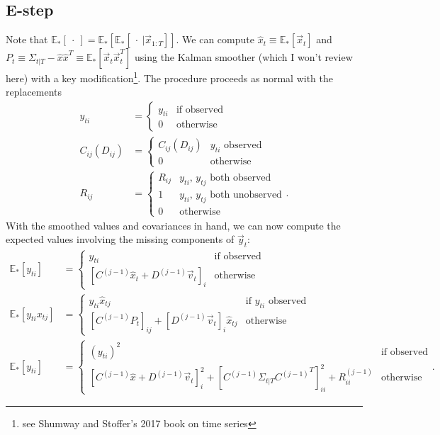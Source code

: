 \documentclass[10pt]{article}
\newcommand\e{\mathbb{E}}
\begin{document}
\subsection{E-step}

Note that $\e_*[\ \cdot\ ] = \e_*[\e_*[\ \cdot\ | \vec{x}_{1:T}]]$. We can compute $\hat{x}_t \equiv \e_*[\vec{x}_t]$ and $P_t \equiv \Sigma_{t|T} - \hat{x}\hat{x}^T \equiv \e_*[\vec{x}_t \vec{x}_t^T]$ using the Kalman smoother (which I won't review here) with a key modification\footnote{see Shumway and Stoffer's 2017 book on time series}. The procedure proceeds as normal with the replacements
\begin{align}
    y_{ti} &= \begin{cases}
        y_{ti} & \text{if observed}\\
        0 & \text{otherwise}
    \end{cases}\\
    C_{ij} (D_{ij}) &= \begin{cases}
        C_{ij}(D_{ij}) & \text{$y_{ti}$ observed}\\
        0 & \text{otherwise}
    \end{cases}\\
    R_{ij} &= \begin{cases}
        R_{ij} & \text{$y_{ti}$, $y_{tj}$ both observed}\\
        1 & \text{$y_{ti}$, $y_{tj}$ both unobserved}\\
        0 & \text{otherwise}
    \end{cases}.
\end{align}
With the smoothed values and covariances in hand, we can now compute the expected values involving the missing components of $\vec{y}_t$:
\begin{align}
    \e_*[y_{ti}] &= \begin{cases}
        y_{ti} & \text{if observed}\\
        [C^{(j-1)} \hat{x}_t + D^{(j-1)} \vec{v}_t]_i & \text{otherwise}
    \end{cases}\\
    \e_*[y_{ti} x_{tj}] &= \begin{cases}
        y_{ti} \hat{x}_{tj} & \text{if $y_{ti}$ observed}\\
        [C^{(j-1)} P_t]_{ij} + [D^{(j-1)} \vec{v}_t]_i \hat{x}_{tj} & \text{otherwise}
    \end{cases}\\
    \e_*[y_{ti}] &= \begin{cases}
        (y_{ti})^2 & \text{if observed}\\
        [C^{(j-1)} \hat{x} + D^{(j-1)} \vec{v}_t]_i^2 + [C^{(j-1)} \Sigma_{t|T} {C^{(j-1)}}^T]_{ii}^2 + R_{ii}^{(j-1)} & \text{otherwise}
    \end{cases}.
\end{align}
\end{document}

